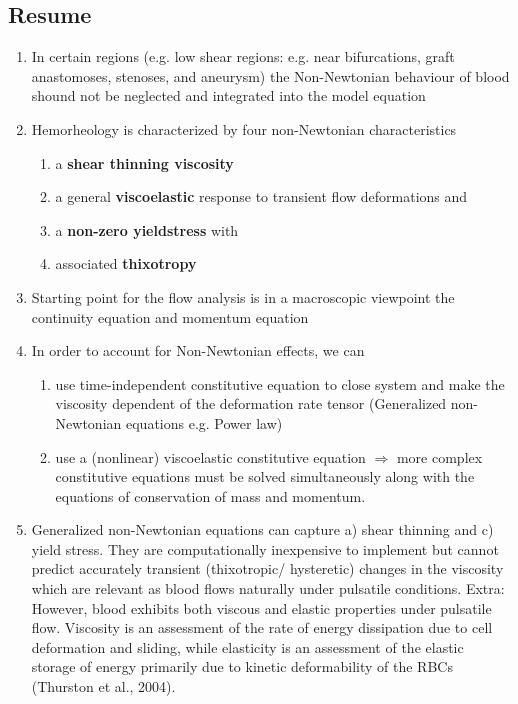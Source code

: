 \documentclass[11pt,letterpaper]{article}
\begin{document}
\subsection*{Resume}
\begin{enumerate}
    \item In certain regions (e.g. low shear regions: e.g. near bifurcations, graft anastomoses, stenoses, and  aneurysm) the Non-Newtonian behaviour of blood shound not be neglected and integrated into the model equation
    \item Hemorheology is characterized by 
four non-Newtonian characteristics 
\begin{enumerate}
 \item a \textbf{shear thinning viscosity}
 \item a general \textbf{viscoelastic} response to transient flow deformations and 
 \item a \textbf{non-zero yieldstress} with
 \item associated \textbf{thixotropy}
\end{enumerate}
    \item Starting point for the flow analysis is in a macroscopic viewpoint the continuity equation and momentum equation
    \item In order to account for Non-Newtonian effects, we can\begin{enumerate}
        \item use time-independent constitutive equation to close system and make the viscosity dependent of the deformation rate tensor (Generalized non-Newtonian equations e.g. Power law)
        \item use a (nonlinear) viscoelastic constitutive equation $\Rightarrow$ more complex constitutive equations must be solved simultaneously along with the equations of conservation of mass and momentum.
    \end{enumerate}  
\item  Generalized non-Newtonian equations can capture a) shear thinning and c) yield stress. They are computationally inexpensive
to implement but cannot predict accurately transient (thixotropic/
hysteretic) changes in the viscosity which are relevant as blood
flows naturally under pulsatile conditions. Extra: However,  blood exhibits both viscous and elastic  properties under pulsatile flow. Viscosity 
is  an  assessment  of the rate of energy dissipation due to cell 
deformation and sliding, while elasticity is an assessment of  the elastic  storage of  energy  primarily due to kinetic deformability of the RBCs (Thurston  et al., 2004). 

\end{enumerate}
\end{document}
